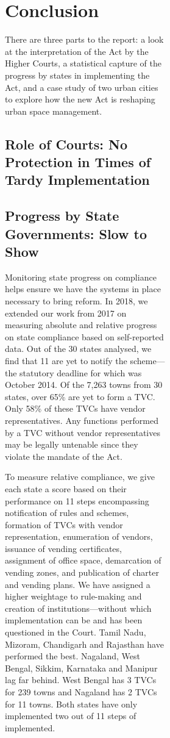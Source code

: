 \documentclass[a4paper, 12pt, twoside]{article}
\begin{document}
\begin{figure}
{\begin{figure}
\begin{figure}
\newpage
\section*{Conclusion}



There are three parts to the report: a look at the interpretation of the Act by the Higher Courts, a statistical capture of the progress by states in implementing the Act, and a case study of two urban cities to explore how the new Act is reshaping urban space management.

\subsection*{Role of Courts: No Protection in Times of Tardy Implementation}


\subsection*{Progress by State Governments: Slow to Show}
Monitoring state progress on compliance helps ensure we have the systems in place necessary to bring reform. In 2018, we extended our work from 2017 on measuring absolute and relative progress on state compliance based on self-reported data. Out of the 30 states analysed, we find that 11 are yet to notify the scheme—the statutory deadline for which was October 2014. Of the 7,263 towns from 30 states, over 65\% are yet to form a TVC. Only 58\% of these TVCs have vendor representatives. Any functions performed by a TVC without vendor representatives may be legally untenable since they violate the mandate of the Act.

To measure relative compliance, we give each state a score based on their performance on 11 steps encompassing notification of rules and schemes, formation of TVCs with vendor representation, enumeration of vendors, issuance of vending certificates, assignment of office space, demarcation of vending zones, and publication of charter and vending plans. We have assigned a higher weightage to rule-making and creation of institutions—without which implementation can be and has been questioned in the Court. Tamil Nadu, Mizoram, Chandigarh and Rajasthan have performed the best. Nagaland, West Bengal, Sikkim, Karnataka and Manipur lag far behind. West Bengal has 3 TVCs for 239 towns and Nagaland has 2 TVCs for 11 towns. Both states have only implemented two out of 11 steps of implemented.


\end{figure}
\end{figure}}
\end{figure}
\end{document}
